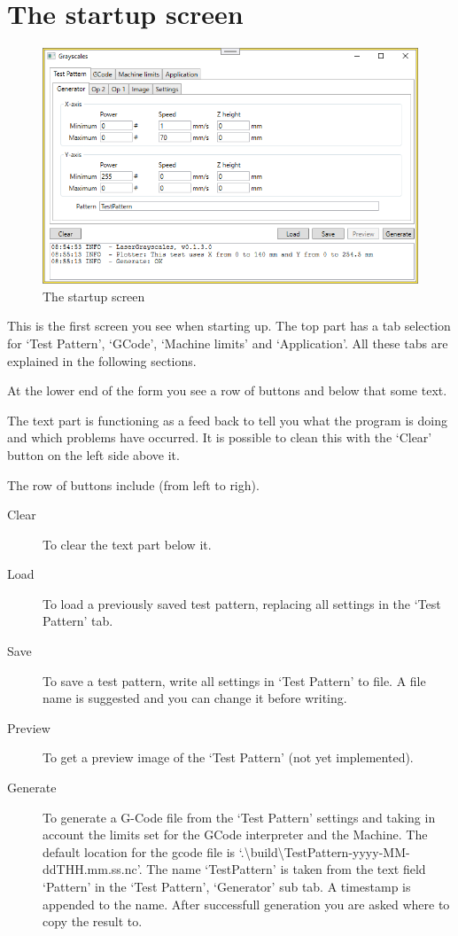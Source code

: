 \section{The startup screen}\label{StartupScreen}
\begin{figure}[h!]
    \centering
    \includegraphics[width=0.8\linewidth]{./images/Grayscales-v0.1.3.png}
    \caption{The startup screen}
\end{figure}

This is the first screen you see when starting up. The top part has a tab selection for `Test Pattern', `GCode', `Machine limits' and `Application'. All these tabs
are explained in the following sections.

At the lower end of the form you see a row of buttons and below that some text.

The text part is functioning as a feed back to tell you what the program is doing and which problems have occurred. It is possible to clean this with the `Clear' button
on the left side above it.

The row of buttons include (from left to righ).
\begin{description}
    \item[Clear] To clear the text part below it.
    \item[Load]  To load a previously saved test pattern, replacing all settings in the `Test Pattern' tab.
    \item[Save]  To save a test pattern, write all settings in `Test Pattern' to file. A file name is suggested and you can change it before writing.
    \item[Preview] To get a preview image of the `Test Pattern' (not yet implemented).
    \item[Generate] To generate a G-Code file from the `Test Pattern' settings and taking in account the limits set for the GCode interpreter and the Machine.
                    The default location for the gcode file is `.\textbackslash{}build\textbackslash{}TestPattern-yyyy-MM-ddTHH.mm.ss.nc'. The name `TestPattern' is
                    taken from the text field `Pattern' in the `Test Pattern', `Generator' sub tab. A timestamp is appended to the name. After successfull generation
                    you are asked where to copy the result to.
\end{description}

